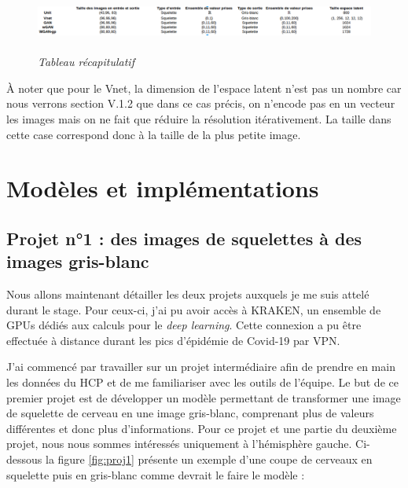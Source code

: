 \documentclass[12pt, oneside, a4paper, titlepage]{article}
\begin{document}
\begin{figure}[H]
    \centering
    \includegraphics[width=14cm, height=2cm]{recap.png}
    \caption{\textit{Tableau récapitulatif}}
    \label{fig:recap}
\end{figure}


À noter que pour le Vnet, la dimension de l'espace latent n'est pas un nombre car nous verrons section V.1.2 que dans ce cas précis, on n'encode pas en un vecteur les images mais on ne fait que réduire la résolution itérativement. La taille dans cette case correspond donc à la taille de la plus petite image.



\newpage

\section{Modèles et implémentations}

\subsection{Projet n°1 : des images de squelettes à des images gris-blanc}

Nous allons maintenant détailler les deux projets auxquels je me suis attelé durant le stage. Pour ceux-ci, j'ai pu avoir accès à KRAKEN, un ensemble de GPUs dédiés aux calculs pour le \textit{deep learning}. Cette connexion a pu être effectuée à distance durant les pics d'épidémie de Covid-19 par VPN. \\

\vspace{5mm} 

J'ai commencé par travailler sur un projet intermédiaire afin de prendre en main les données du HCP et de me familiariser avec les outils de l'équipe. Le but de ce premier projet est de développer un modèle permettant de transformer une image de squelette de cerveau en une image gris-blanc, comprenant plus de valeurs différentes et donc plus d'informations. Pour ce projet et une partie du deuxième projet, nous nous sommes intéressés uniquement à l'hémisphère gauche. Ci-dessous la figure \ref{fig:proj1} présente un exemple d'une coupe de cerveaux en squelette puis en gris-blanc comme devrait le faire le modèle :
\end{document}
